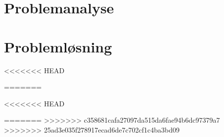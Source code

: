 


\part{Problemanalyse} 






\part{Problemløsning}




<<<<<<< HEAD

=======

<<<<<<< HEAD

=======
>>>>>>> c358681cafa27097da515da6fae94b6dc97379a7
>>>>>>> 25ad3e035f278917ecad6de7c702cf1c4ba3bd09



